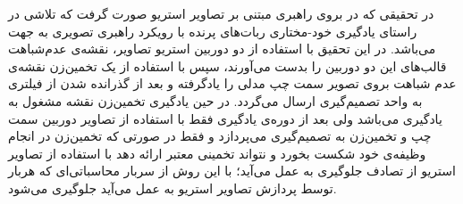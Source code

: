 
در تحقیقی که در  بروی راهبری مبتنی بر تصاویر استریو صورت گرفت که تلاشی در راستای یادگیری خود-مختاری ربات‌های پرنده با رویکرد راهبری تصویری به جهت  می‌باشد. در این تحقیق با استفاده از دو دوربین استریو تصاویر، نقشه‌ی عدم‌شباهت قالب‌های این دو دوربین را بدست می‌آورند، سپس با استفاده از یک تخمین‌زن نقشه‌ی عدم شباهت بروی تصویر سمت چپ مدلی را یادگرفته و بعد از گذرانده شدن از فیلتری به واحد تصمیم‌گیری ارسال می‌گردد. در حین یادگیری تخمین‌‌زن نقشه مشغول به یادگیری می‌باشد ولی بعد از دوره‌ی یادگیری فقط با استفاده از تصاویر دوربین سمت چپ و تخمین‌زن به تصمیم‌گیری می‌پردازد و فقط در صورتی که تخمین‌زن در انجام وظیفه‌ی خود شکست بخورد و نتواند تخمینی معتبر ارائه دهد با استفاده از تصاویر استریو از تصادف جلوگیری به عمل می‌آید؛ با این روش از سربار محاسباتی‌ای که هربار توسط پردازش تصاویر استریو به عمل می‌آید جلوگیری می‌شود.